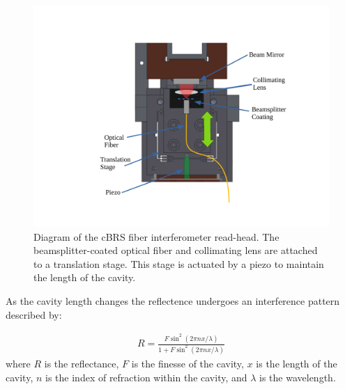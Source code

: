 \documentclass [12pt, proquest]{uwthesis}[2019]
\begin{document}
\begin{figure}[!h]
\begin{center}
\includegraphics[width=\textwidth]{cBRSOptics.pdf}
\end{center}
\caption[Diagram of the cBRS fiber interferometer read-head]{Diagram of the cBRS fiber interferometer read-head. The beamsplitter-coated optical fiber and collimating lens are attached to a translation stage. This stage is actuated by a piezo to maintain the length of the cavity.}
\label{cBRSOpt}
\end{figure}

As the cavity length changes the reflectence undergoes an interference pattern described by:

\begin{align}
R=\frac{F \sin^2(2\pi n x/\lambda)}{1+F \sin^2(2\pi n x/\lambda)}
\end{align}
where $R$ is the reflectance, $F$ is the finesse of the cavity, $x$ is the length of the cavity, $n$ is the index of refraction within the cavity, and $\lambda$ is the wavelength.
\end{document}
